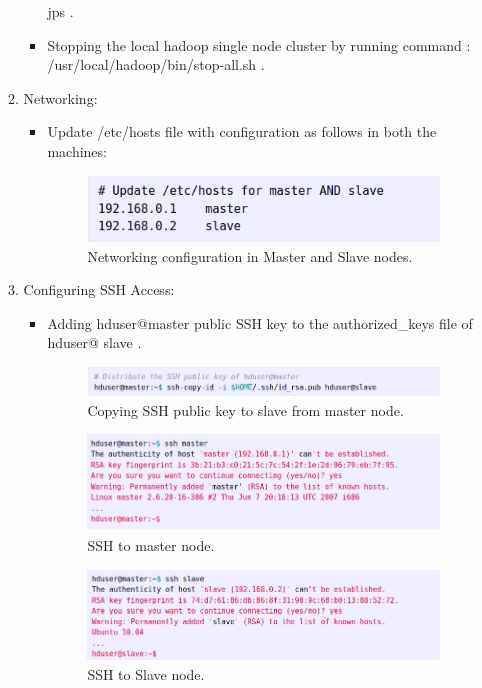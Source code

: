 \documentclass[a4paper,10pt]{article}
\begin{document}
\begin{itemize}
\begin{enumerate}
\begin{itemize}
		jps .
		\item Stopping the local hadoop single node cluster by running command : 
		/usr/local/hadoop/bin/stop-all.sh .
	\end{itemize}
 \item Networking:
 \begin{itemize}
 	\item Update /etc/hosts file with configuration as follows in both the machines:
 	\begin{figure}[h]
 		\includegraphics[scale=0.45,center]{exptFourScreenShot/NetConfInNodes.png}
 		\caption{Networking configuration in Master and Slave nodes.}
 		\label{fig:0.1}
 	\end{figure}
 \end{itemize}	
 \pagebreak
 \item Configuring SSH Access:
 \begin{itemize}
   \item Adding hduser{\selectfont @}master public SSH key to the authorized\_keys file of hduser{\selectfont @} slave .
   \begin{figure}[h]
   	\includegraphics[scale=0.45,center]{exptFourScreenShot/sshAccess.png}
   	\caption{Copying SSH public key to slave from master node.}
   	\label{fig:0.2}
   \end{figure}
   \begin{figure}[h]
   	\includegraphics[scale=0.45,center]{exptFourScreenShot/sshMaster.png}
   	\caption{SSH to master node.}
   	\label{fig:0.3}
   \end{figure}
   	\begin{figure}[h]
   		\includegraphics[scale=0.45,center]{exptFourScreenShot/sshSlave.png}
   		\caption{SSH to Slave node.}
   		\label{fig:0.4}
   	\end{figure}
 \end{itemize}
\end{enumerate}
\end{itemize}
\end{document}
